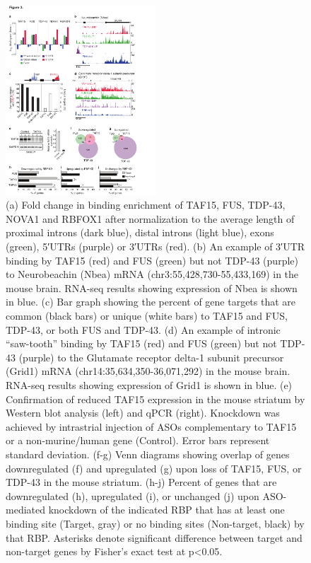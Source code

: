 \begin{figure}[ht]
  \centering
  \includegraphics[width=0.5\textwidth]{chapter_2_figures/Figure_3}
  \caption[Figure 3. TAF15 and FUS exhibit similar RNA interaction profiles in the mouse brain]{ (a) Fold change in binding enrichment of TAF15, FUS, TDP-43, NOVA1 and RBFOX1 after normalization to the average length of proximal introns (dark blue), distal introns (light blue), exons (green), 5′UTRs (purple) or 3′UTRs (red). (b) An example of 3′UTR binding by TAF15 (red) and FUS (green) but not TDP-43 (purple) to Neurobeachin (Nbea) mRNA (chr3:55,428,730-55,433,169) in the mouse brain. RNA-seq results showing expression of Nbea is shown in blue. (c) Bar graph showing the percent of gene targets that are common (black bars) or unique (white bars) to TAF15 and FUS, TDP-43, or both FUS and TDP-43. (d) An example of intronic “saw-tooth” binding by TAF15 (red) and FUS (green) but not TDP-43 (purple) to the Glutamate receptor delta-1 subunit precursor (Grid1) mRNA (chr14:35,634,350-36,071,292) in the mouse brain. RNA-seq results showing expression of Grid1 is shown in blue. (e) Confirmation of reduced TAF15 expression in the mouse striatum by Western blot analysis (left) and qPCR (right). Knockdown was achieved by intrastrial injection of ASOs complementary to TAF15 or a non-murine/human gene (Control). Error bars represent standard deviation. (f-g) Venn diagrams showing overlap of genes downregulated (f) and upregulated (g) upon loss of TAF15, FUS, or TDP-43 in the mouse striatum. (h-j) Percent of genes that are downregulated (h), upregulated (i), or unchanged (j) upon ASO-mediated knockdown of the indicated RBP that has at least one binding site (Target, gray) or no binding sites (Non-target, black) by that RBP. Asterisks denote significant difference between target and non-target genes by Fisher’s exact test at p<0.05.}
  \label{fig:Figure_3}
\end{figure}

